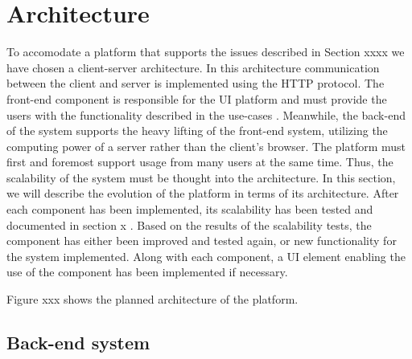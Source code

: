 \section{Architecture}
To accomodate a platform that supports the issues described in Section xxxx  we have chosen a client-server architecture. 
In this architecture communication between the client and server is implemented using the HTTP protocol. 
The front-end component is responsible for the UI platform and must provide the users with the functionality described in the use-cases .
Meanwhile, the back-end of the system supports the heavy lifting of the front-end system, utilizing the computing power of a server rather than the client's browser. 
The platform must first and foremost support usage from many users at the same time. 
Thus, the scalability of the system must be thought into the architecture. 
In this section, we will describe the evolution of the platform in terms of its architecture.
After each component has been implemented, its scalability has been tested and documented in section x .
Based on the results of the scalability tests, the component has either been improved and tested again, or new functionality for the system implemented. 
Along with each component, a UI element enabling the use of the component has been implemented if necessary. 


Figure xxx shows the planned architecture of the platform. 



\subsection{Back-end system}
